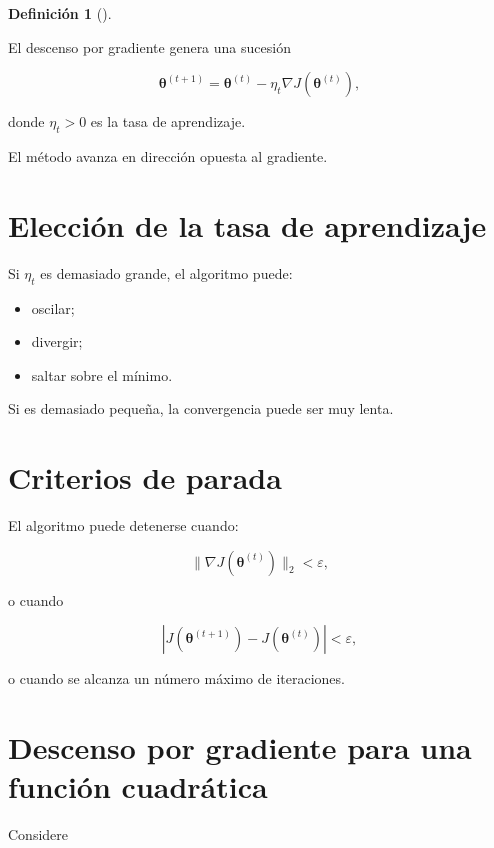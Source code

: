 \documentclass[
  spanish,
  11pt,
  letterpaper,
  DIV=11,
  numbers=noendperiod]{scrreprt}
\providecommand{\tightlist}{%
  \setlength{\itemsep}{0pt}\setlength{\parskip}{0pt}}
\theoremstyle{definition}
\newtheorem{definition}{Definición}[chapter]
\theoremstyle{plain}
\theoremstyle{definition}
\theoremstyle{remark}
\begin{document}
\begin{definition}[]\protect\hypertarget{def-descenso-gradiente}{}\label{def-descenso-gradiente}

El descenso por gradiente genera una sucesión

\[
\boldsymbol{\theta}^{(t+1)}
=
\boldsymbol{\theta}^{(t)}
-
\eta_t
\nabla J(
\boldsymbol{\theta}^{(t)}
),
\]

donde \(\eta_t>0\) es la tasa de aprendizaje.

\end{definition}

El método avanza en dirección opuesta al gradiente.

\section{Elección de la tasa de
aprendizaje}\label{elecciuxf3n-de-la-tasa-de-aprendizaje}

Si \(\eta_t\) es demasiado grande, el algoritmo puede:

\begin{itemize}
\tightlist
\item
  oscilar;
\item
  divergir;
\item
  saltar sobre el mínimo.
\end{itemize}

Si es demasiado pequeña, la convergencia puede ser muy lenta.

\section{Criterios de parada}\label{criterios-de-parada}

El algoritmo puede detenerse cuando:

\[
\|
\nabla J(\boldsymbol{\theta}^{(t)})
\|_2
<
\varepsilon,
\]

o cuando

\[
|
J(\boldsymbol{\theta}^{(t+1)})
-
J(\boldsymbol{\theta}^{(t)})
|
<
\varepsilon,
\]

o cuando se alcanza un número máximo de iteraciones.

\section{Descenso por gradiente para una función
cuadrática}\label{descenso-por-gradiente-para-una-funciuxf3n-cuadruxe1tica}

Considere
\end{document}
